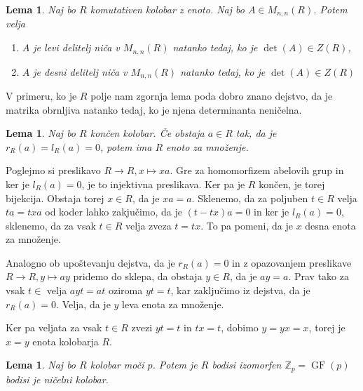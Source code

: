 \documentclass[a4paper, 12pt]{amsart}
\theoremstyle{definition} %
\theoremstyle{plain} %
\newtheorem{lema}[definicija]{Lema}
\newcommand{\Z}{\mathbb Z}
\DeclareMathOperator{\GF}{GF}
\DeclareMathOperator{\deter}{det}
\begin{document}
\begin{lema}
\label{enostranskiDelitelji0Matricni}
Naj bo $R$ komutativen kolobar z enoto. Naj bo $A\in M_{n,n}(R)$. Potem velja
\begin{enumerate}
\item $A$ je levi delitelj niča v $M_{n,n}(R)$ natanko tedaj, ko je $\deter(A)\in Z(R)$,
\item $A$ je desni delitelj niča v $M_{n,n}(R)$ natanko tedaj, ko je $\deter(A)\in Z(R)$
\end{enumerate}
\end{lema}

\proof

 \endproof
V primeru, ko je $R$ polje nam zgornja lema poda dobro znano dejstvo, da je matrika obrnljiva natanko tedaj, ko je njena determinanta neničelna.


\begin{lema}
\label{enota}
Naj bo $R$ končen kolobar. Če obstaja $a\in R$ tak, da je $r_R(a) = l_R(a) = 0$, potem ima $R$ enoto za množenje.
\end{lema}

\proof
Poglejmo si preslikavo $R \rightarrow R, x\mapsto xa$. Gre za homomorfizem abelovih grup in ker je $l_R(a) = 0$, je to injektivna preslikava. Ker pa je $R$ končen, je torej bijekcija. Obstaja torej $x \in R$, da je $xa = a$. Sklenemo, da za poljuben $t\in R$ velja $ta = txa$ od koder lahko zakjučimo, da je $(t-tx)a = 0$ in ker je $l_R(a) = 0$, sklenemo, da  za vsak $t\in R$ velja zveza $t = tx$. To pa pomeni, da je $x$ desna enota za množenje.

Analogno ob upoštevanju dejstva, da je $r_R(a) = 0$ in z opazovanjem preslikave $R\rightarrow R, y \mapsto ay$ pridemo do sklepa, da obstaja $y \in R$, da je $ay=a$. Prav tako za vsak $t\in $ velja $ayt = at$ oziroma $yt=t$, kar zaključimo iz dejstva, da je $r_R(a) =0$. Velja, da je $y$ leva enota za množenje.

Ker pa veljata za vsak $t\in R$ zvezi $yt=t$ in $tx=t$, dobimo $y=yx=x$, torej je $x=y$ enota kolobarja $R$.
\endproof

\begin{lema}
\label{pkolobar}
Naj bo $R$ kolobar moči $p$. Potem je $R$ bodisi izomorfen $\Z_p = \GF(p)$ bodisi je ničelni kolobar.
\end{lema} 
\end{document}
